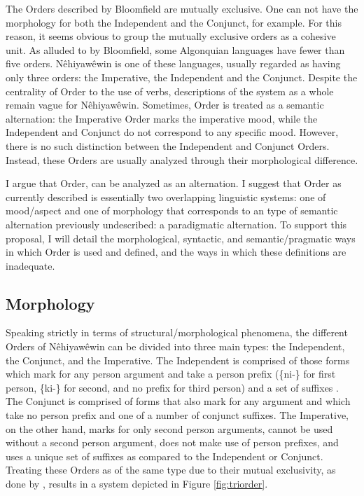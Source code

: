 The Orders described by Bloomfield are mutually exclusive. One can not have the morphology for both the Independent and the Conjunct, for example. For this reason, it seems obvious to group the  mutually exclusive orders as a cohesive unit. As alluded to by Bloomfield, some Algonquian languages have fewer than five orders. Nêhiyawêwin is one of these languages, usually regarded as having only three orders: the Imperative, the Independent and the Conjunct. Despite the centrality of Order to the use of verbs, descriptions of the system as a whole remain vague for Nêhiyawêwin. Sometimes, Order is treated as a semantic alternation: the Imperative Order marks the imperative mood, while the  Independent and Conjunct do not correspond to any specific mood. However, there is no such distinction between the Independent and Conjunct Orders. Instead, these Orders are usually analyzed through their morphological difference.

I argue that Order, can be analyzed as an alternation. I suggest that Order as currently described is essentially two overlapping linguistic systems: one of mood/aspect and one of morphology that corresponds to an type of semantic alternation previously undescribed: a paradigmatic alternation. To support this proposal, I will detail the morphological, syntactic, and semantic/pragmatic ways in which Order is used and defined, and the ways in which these definitions are inadequate.

\subsection{Morphology}
Speaking strictly in terms of structural/morphological phenomena, the different Orders of Nêhiyawêwin can be divided into three main types: the Independent, the Conjunct, and the Imperative. The Independent is comprised of those forms which mark for any person argument and take a person prefix (\{ni-\} for first person, \{ki-\} for second, and no prefix for third person) and a set of suffixes \citep{Bloomfield1946,Wolfart1973}. The Conjunct is comprised of forms that also mark for any argument and which take no person prefix and one of a number of conjunct suffixes. The Imperative, on the other hand, marks for only second person arguments, cannot be used without a second person argument, does not make use of person prefixes, and uses a unique set of suffixes as compared to the Independent or Conjunct. Treating these Orders as of the same type due to their mutual exclusivity, as done by \citet{Bloomfield1946}, results in a system depicted in Figure \ref{fig:triorder}. 

